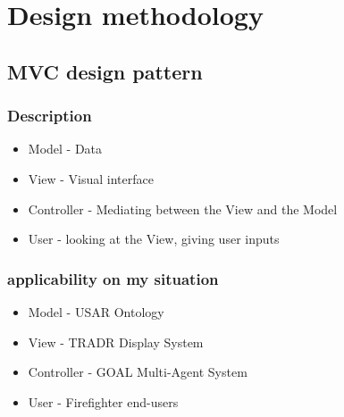 \chapter{Design methodology}
\section{MVC design pattern}
\subsection{Description}
\begin{itemize}
\item Model - Data
\item View - Visual interface
\item Controller - Mediating between the View and the Model
\item User - looking at the View, giving user inputs
\end{itemize}

\subsection{applicability on my situation}
\begin{itemize}
\item Model - USAR Ontology
\item View - TRADR Display System
\item Controller - GOAL Multi-Agent System
\item User - Firefighter end-users
\end{itemize}
      
    
    
  
  